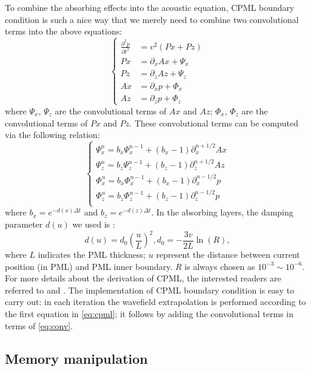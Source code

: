 To combine the absorbing effects into the acoustic equation, CPML boundary condition is such a nice way that we merely need to combine two convolutional terms into the above equations:
\begin{equation}\label{eq:cpml}
\left\{
\begin{split}
\frac{\partial^2 p}{\partial t^2}&=v^2\left(Px+Pz\right)\\
Px&=\partial_x Ax+\Psi_x\\
Pz&=\partial_z Az+\Psi_z\\
Ax&=\partial_x p+\Phi_x\\
Az&=\partial_z p+\Phi_z
\end{split}
\right.
\end{equation}
where $\Psi_x$, $\Psi_z$ are the convolutional terms of $Ax$ and $Az$; $\Phi_x$, $\Phi_z$ are the convolutional terms of $Px$ and $Pz$. These convolutional terms can be computed via the following relation:
\begin{equation}\label{eq:conv}
\left\{
\begin{split}
\Psi_x^n=b_x \Psi_x^{n-1}+(b_x-1) \partial_x^{n+1/2}Ax\\
\Psi_z^n=b_z \Psi_z^{n-1}+(b_z-1) \partial_z^{n+1/2}Az\\
\Phi_x^n=b_x \Phi_x^{n-1}+(b_x-1) \partial_x^{n-1/2}p\\
\Phi_z^n=b_z \Phi_z^{n-1}+(b_z-1) \partial_z^{n-1/2}p\\
\end{split}
\right.
\end{equation}
where $b_x=e^{-d(x)\Delta t}$ and $b_z=e^{-d(z)\Delta t}$. In the absorbing layers, the damping parameter $d(u)$ we used is \citep{collino2001application}:
\begin{equation}
 d(u)=d_0(\frac{u}{L})^2, d_0=-\frac{3v}{2L}\ln(R),
\end{equation}
where $ L$ indicates the PML thickness; $u$ represent the distance between current position (in PML) and PML inner boundary. $R$ is always chosen as $10^{-3}\sim 10^{-6}$. For more details about the derivation of CPML, the interested readers are referred to \cite{collino2001application} and \cite{komatitsch2007unsplit}. The implementation of CPML boundary condition is easy to carry out: in each iteration the wavefield extrapolation is performed according to the first equation in \eqref{eq:cpml}; it follows by adding  the convolutional terms in terms of \eqref{eq:conv}.

\subsection{Memory manipulation}


